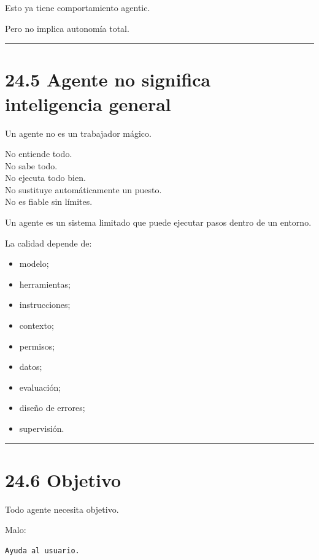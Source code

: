 Esto ya tiene comportamiento agentic.

Pero no implica autonomía total.

\begin{center}\rule{0.5\linewidth}{0.5pt}\end{center}

\section{24.5 Agente no significa inteligencia
general}\label{agente-no-significa-inteligencia-general}

Un agente no es un trabajador mágico.

No entiende todo.\\
No sabe todo.\\
No ejecuta todo bien.\\
No sustituye automáticamente un puesto.\\
No es fiable sin límites.

Un agente es un sistema limitado que puede ejecutar pasos dentro de un
entorno.

La calidad depende de:

\begin{itemize}
\tightlist
\item
  modelo;
\item
  herramientas;
\item
  instrucciones;
\item
  contexto;
\item
  permisos;
\item
  datos;
\item
  evaluación;
\item
  diseño de errores;
\item
  supervisión.
\end{itemize}

\begin{center}\rule{0.5\linewidth}{0.5pt}\end{center}

\section{24.6 Objetivo}\label{objetivo-2}

Todo agente necesita objetivo.

Malo:

\begin{lstlisting}
Ayuda al usuario.
\end{lstlisting}

